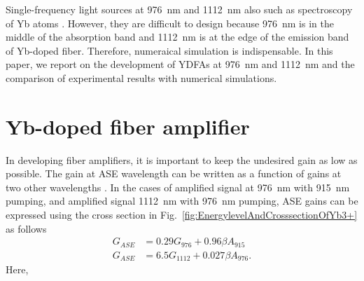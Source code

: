 \documentclass{osa-article}
\begin{document}
Single-frequency light sources at \SI{976}{nm} and \SI{1112}{nm} also such as spectroscopy of Yb atoms  \cite{franzenSinglestage1112Nm2018}.
However, they are difficult to design because \SI{976}{nm} is in the middle of the absorption band and \SI{1112}{nm} is at the edge of the emission band of Yb-doped fiber.
Therefore, numeraical simulation is indispensable.
In this paper, we report on the development of YDFAs at \SI{976}{nm} and \SI{1112}{nm} and the comparison of experimental results with numerical simulations.

\section{Yb-doped fiber amplifier}
In developing fiber amplifiers, it is important to keep the undesired gain as low as possible.
The gain at ASE wavelength can be written as a function of gains at two other wavelengths \cite{nilssonRingdopedCladdingpumpedSinglemode1998}.
In the cases of amplified signal at \SI{976}{nm} with \SI{915}{nm} pumping, and amplified signal \SI{1112}{nm} with \SI{976}{nm} pumping, ASE gains can be expressed using the cross section in Fig.~\ref{fig:EnergylevelAndCrosssectionOfYb3+} as follows
\begin{align}
  G_{ASE} &= 0.29G_{976} + 0.96\beta A_{915}\\
  G_{ASE} &= 6.5G_{1112} + 0.027\beta A_{976}.
\end{align}
Here,
\end{document}
